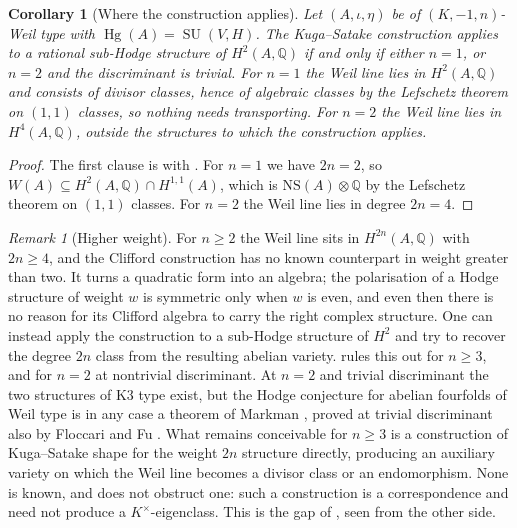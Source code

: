 \documentclass[11pt,reqno]{amsart}
\theoremstyle{plain}
\newtheorem{corollary}[theorem]{Corollary}
\theoremstyle{definition}
\theoremstyle{remark}
\newtheorem{remark}[theorem]{Remark}
\newcommand{\QQ}{\mathbb{Q}}
\newcommand{\HW}{W}                      %
\newcommand{\NS}{\mathrm{NS}}
\DeclareMathOperator{\Hg}{Hg}
\DeclareMathOperator{\SU}{SU}
\newcommand{\Kx}{K^{\times}}
\begin{document}
\begin{corollary}[Where the construction applies]\label{cor:ksboundary}
Let $(A,\iota,\eta)$ be of $(K,-1,n)$-Weil type with $\Hg(A)=\SU(V,H)$. The
Kuga--Satake construction applies to a rational sub-Hodge structure of
$H^{2}(A,\QQ)$ if and only if either $n=1$, or $n=2$ and the discriminant is
trivial. For $n=1$ the Weil line lies in $H^{2}(A,\QQ)$ and consists of
divisor classes, hence of algebraic classes by the Lefschetz theorem on
$(1,1)$ classes, so nothing needs transporting. For $n=2$ the Weil line lies
in $H^{4}(A,\QQ)$, outside the structures to which the construction applies.
\end{corollary}

\begin{proof}
The first clause is  with . For $n=1$
we have $2n=2$, so $\HW(A)\subseteq H^{2}(A,\QQ)\cap H^{1,1}(A)$, which is
$\NS(A)\otimes\QQ$ by the Lefschetz theorem on $(1,1)$ classes. For $n=2$ the
Weil line lies in degree $2n=4$.
\end{proof}

\begin{remark}[Higher weight]\label{rem:nohigherks}
For $n\ge2$ the Weil line sits in $H^{2n}(A,\QQ)$ with $2n\ge4$, and the
Clifford construction has no known counterpart in weight greater than two. It
turns a quadratic form into an algebra; the polarisation of a Hodge structure
of weight $w$ is symmetric only when $w$ is even, and even then there is no
reason for its Clifford algebra to carry the right complex structure. One
can instead apply the construction to a sub-Hodge structure of $H^{2}$ and
try to recover the degree $2n$ class from the resulting abelian variety.
 rules this out for $n\ge3$, and for $n=2$ at nontrivial
discriminant. At $n=2$ and trivial discriminant the two structures of K3 type
exist, but the Hodge conjecture for abelian fourfolds of Weil type is in any
case a theorem of Markman \cite{Mar25a,Mar25b}, proved at trivial
discriminant also by Floccari and Fu \cite{FF26}. What remains conceivable for
$n\ge3$ is a construction of Kuga--Satake shape for the weight $2n$ structure
directly, producing an auxiliary variety on which the Weil line becomes a
divisor class or an endomorphism. None is known, and  does
not obstruct one: such a construction is a correspondence and need not
produce a $\Kx$-eigenclass. This is the gap of \cite[Remark~2.4]{paperIII},
seen from the other side.
\end{remark}
\end{document}
